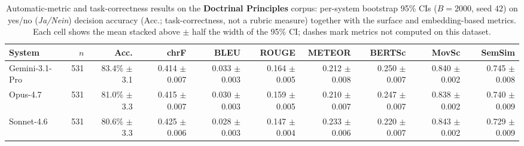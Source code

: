 \begin{table}[t]
\centering\footnotesize
\caption{Automatic-metric and task-correctness results on the \textbf{Doctrinal Principles} corpus: per-system bootstrap 95\% CIs ($B=2000$, seed $42$) on yes/no (\emph{Ja/Nein}) decision accuracy (Acc.; task-correctness, not a rubric measure) together with the surface and embedding-based metrics. Each cell shows the mean stacked above $\pm$ half the width of the 95\% CI; dashes mark metrics not computed on this dataset.}
\label{tbl-full-results-auto-grundpr}
\setlength{\tabcolsep}{4pt}
\begin{tabular*}{\textwidth}{@{\extracolsep{\fill}}lrrrrrrrrr@{}}
\toprule
System & $n$ & Acc. & chrF & BLEU & ROUGE & METEOR & BERTSc & MovSc & SemSim \\
\midrule
Gemini-3.1-Pro & 531 & \shortstack[r]{83.4\%\\{\scriptsize $\pm$3.1}} & \shortstack[r]{0.414\\{\scriptsize $\pm$0.007}} & \shortstack[r]{0.033\\{\scriptsize $\pm$0.003}} & \shortstack[r]{0.164\\{\scriptsize $\pm$0.005}} & \shortstack[r]{0.212\\{\scriptsize $\pm$0.008}} & \shortstack[r]{0.250\\{\scriptsize $\pm$0.007}} & \shortstack[r]{0.840\\{\scriptsize $\pm$0.002}} & \shortstack[r]{0.745\\{\scriptsize $\pm$0.008}} \\
Opus-4.7 & 531 & \shortstack[r]{81.0\%\\{\scriptsize $\pm$3.3}} & \shortstack[r]{0.415\\{\scriptsize $\pm$0.007}} & \shortstack[r]{0.030\\{\scriptsize $\pm$0.003}} & \shortstack[r]{0.159\\{\scriptsize $\pm$0.005}} & \shortstack[r]{0.210\\{\scriptsize $\pm$0.007}} & \shortstack[r]{0.247\\{\scriptsize $\pm$0.007}} & \shortstack[r]{0.838\\{\scriptsize $\pm$0.002}} & \shortstack[r]{0.740\\{\scriptsize $\pm$0.009}} \\
Sonnet-4.6 & 531 & \shortstack[r]{80.6\%\\{\scriptsize $\pm$3.3}} & \shortstack[r]{0.425\\{\scriptsize $\pm$0.006}} & \shortstack[r]{0.028\\{\scriptsize $\pm$0.003}} & \shortstack[r]{0.147\\{\scriptsize $\pm$0.004}} & \shortstack[r]{0.233\\{\scriptsize $\pm$0.006}} & \shortstack[r]{0.220\\{\scriptsize $\pm$0.007}} & \shortstack[r]{0.843\\{\scriptsize $\pm$0.002}} & \shortstack[r]{0.729\\{\scriptsize $\pm$0.009}} \\

\end{tabular*}
\end{table}
